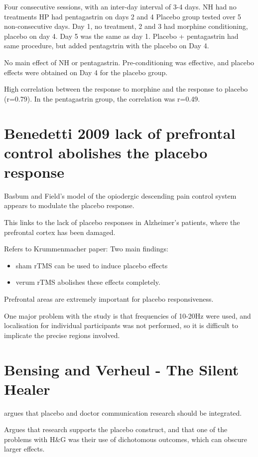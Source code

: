\documentclass{article}
\begin{document}
Four consecutive sessions, with an inter-day interval of 3-4 days.
NH had no treatments
HP had pentagastrin on days 2 and 4
Placebo group tested over 5 non-consecutive days. Day 1, no treatment, 2 and 3 had morphine conditioning, placebo on day 4. Day 5 was the same as day 1.
Placebo + pentagastrin had same procedure, but added pentagstrin with the placebo on Day 4. 

No main effect of NH or pentagastrin. Pre-conditioning was effective, and placebo effects were obtained on Day 4 for the placebo group. 

High correlation between the response to morphine and the response to placebo (r=0.79). In the pentagastrin group, the correlation was r=0.49. 

\section{Benedetti 2009 lack of prefrontal control abolishes the placebo response}
\label{sec:benedetti-2009-lack}

Basbum and Field's model of the opiodergic descending pain control system appears to modulate the placebo response. 

This links to the lack of placebo responses in Alzheimer's patients, where the prefrontal cortex has been damaged. 

Refers to Krummenmacher paper:
Two main findings:
\begin{itemize}
\item sham rTMS can be used to induce placebo effects
\item verum rTMS abolishes these effects completely.
\end{itemize}

Prefrontal areas are extremely important for placebo responsiveness. 

One major problem with the study is that frequencies of 10-20Hz were used, and localisation for individual participants was not performed, so it is difficult to implicate the precise regions involved. 

\section{Bensing and Verheul - The Silent Healer}
\label{sec:bens-verh-silent}

argues that placebo and doctor communication research should be integrated. 

Argues that research supports the placebo construct, and that one of the problems with H\&G was their use of dichotomous outcomes, which can obscure larger effects. 
\end{document}
